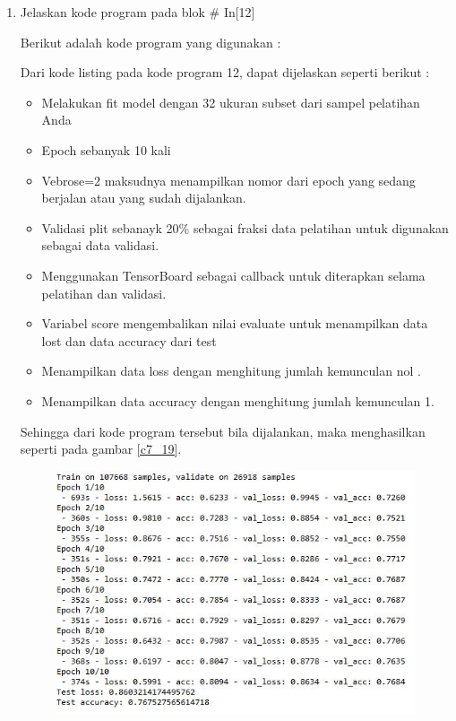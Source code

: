 \begin{enumerate}
\begin{itemize}
\end{itemize}
\par Sehingga dari kode program tersebut bila dijalankan, maka menghasilkan seperti pada gambar \ref{c7_18}.
\begin{figure}[!htbp]
	\centerline{\texttt{[image: figures/huda/chapter7/18.JPG]}}
	\caption{In[11]}
	\label{c7_18}
\end{figure}
\item Jelaskan kode program pada blok \# In[12]
\par Berikut adalah kode program yang digunakan :

\par Dari kode listing pada kode program 12, dapat dijelaskan seperti berikut :
\begin{itemize}
\item Melakukan fit model dengan 32 ukuran subset dari sampel pelatihan Anda
\item Epoch sebanyak 10 kali
\item Vebrose=2 maksudnya menampilkan nomor dari epoch yang sedang berjalan atau yang sudah dijalankan.
\item Validasi plit sebanayk 20\% sebagai fraksi data pelatihan untuk digunakan sebagai data validasi.
\item Menggunakan TensorBoard sebagai callback untuk diterapkan selama pelatihan dan validasi.
\item Variabel score mengembalikan nilai evaluate untuk menampilkan data lost dan data accuracy dari test
\item Menampilkan data loss dengan menghitung jumlah kemunculan nol .
\item Menampilkan data accuracy dengan menghitung jumlah kemunculan 1.
\end{itemize}
\par Sehingga dari kode program tersebut bila dijalankan, maka menghasilkan seperti pada gambar \ref{c7_19}.
\begin{figure}[!htbp]
	\centerline{\includegraphics[width=1\textwidth]{figures/huda/chapter7/19.JPG}}

\end{figure}
\end{enumerate}
